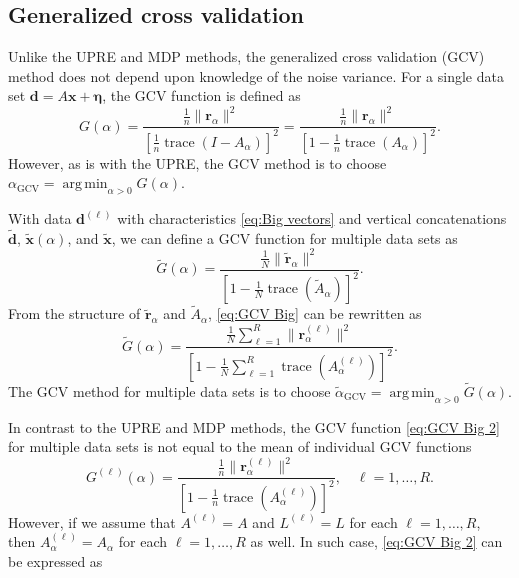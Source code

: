 \documentclass[12pt]{article}
\newcommand{\dVec}{\mathbf{d}}	%
\newcommand{\xVec}{\mathbf{x}}	%
\DeclareMathOperator{\trace}{trace}		%
\newcommand{\regparam}{\alpha}
\DeclareMathOperator*{\argmin}{arg\,min}
\newcommand{\noise}{\eta}	%
\newcommand{\noiseVec}{\bm{\noise}}	%
\newcommand{\regres}{\mathbf{r}_{\regparam}}	%
\newcommand{\A}{A_{\regparam}}	%
\newcommand{\G}{G}	%
\newcommand{\GCV}{\text{GCV}}	%
\begin{document}
\subsection{Generalized cross validation} \label{sec:GCV}
Unlike the UPRE and MDP methods, the generalized cross validation (GCV) method \cite{Wahba1977,Wahba1990} does not depend upon knowledge of the noise variance. For a single data set $\dVec = A\xVec + \noiseVec$, the GCV function is defined as
\begin{equation}
\label{eq:GCV}
\G(\regparam) = \frac{\frac{1}{n}\|\regres\|^2}{\left[\frac{1}{n}\trace(I-\A)\right]^2} = \frac{\frac{1}{n}\|\regres\|^2}{\left[1 - \frac{1}{n}\trace(\A)\right]^2}.
\end{equation}
However, as is with the UPRE, the GCV method is to choose $\regparam_\GCV = \argmin_{\regparam > 0} \G(\regparam)$. \par 
With data $\dVec^{(\ell)}$ with characteristics \eqref{eq:Big vectors} and vertical concatenations $\widetilde{\dVec}$, $\widetilde{\xVec}(\regparam)$, and $\widetilde{\xVec}$, we can define a GCV function for multiple data sets as
\begin{equation}
\label{eq:GCV Big}
\widetilde{\G}(\regparam) = \frac{\frac{1}{N}\|\widetilde{\mathbf{r}}_\regparam\|^2}{\left[1 - \frac{1}{N}\trace(\widetilde{A}_\regparam)\right]^2}.
\end{equation}
From the structure of $\widetilde{\mathbf{r}}_\regparam$ and $\widetilde{A}_\regparam$, \eqref{eq:GCV Big} can be rewritten as
\begin{equation}
\label{eq:GCV Big 2}
\widetilde{\G}(\regparam) = \frac{\frac{1}{N}\sum_{\ell=1}^R \|\regres^{(\ell)}\|^2}{\left[1 - \frac{1}{N}\sum_{\ell=1}^R \trace\left(\A^{(\ell)}\right)\right]^2}.
\end{equation}
The GCV method for multiple data sets is to choose $\widetilde{\regparam}_{\textrm{GCV}} = \argmin_{\regparam > 0} \widetilde{\G}(\regparam)$. \par 
In contrast to the UPRE and MDP methods, the GCV function \eqref{eq:GCV Big 2} for multiple data sets is not equal to the mean of individual GCV functions
\begin{equation}
\label{eq:Individual GCV}
\G^{(\ell)}(\regparam) = \frac{\frac{1}{n}\|\regres^{(\ell)}\|^2}{\left[1 - \frac{1}{n}\trace\left(\A^{(\ell)}\right)\right]^2}, \quad \ell = 1,\ldots,R.
\end{equation}
However, if we assume that $A^{(\ell)} = A$ and $L^{(\ell)} = L$ for each $\ell = 1,\ldots,R$, then $\A^{(\ell)} = \A$ for each $\ell = 1,\ldots,R$ as well. In such case, \eqref{eq:GCV Big 2} can be expressed as
\end{document}

